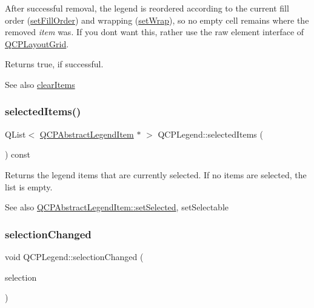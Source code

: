 After successful removal, the legend is reordered according to the current fill order (\hyperlink{class_q_c_p_layout_grid_affc2f3cfd22f28698c5b29b960d2a391}{set\+Fill\+Order}) and wrapping (\hyperlink{class_q_c_p_layout_grid_ab36af18d77e4428386d02970382ee598}{set\+Wrap}), so no empty cell remains where the removed {\itshape item} was. If you don\textquotesingle{}t want this, rather use the raw element interface of \hyperlink{class_q_c_p_layout_grid}{Q\+C\+P\+Layout\+Grid}.

Returns true, if successful.

\begin{DoxySeeAlso}{See also}
\hyperlink{class_q_c_p_legend_a24795c7250eb5214fcea16b7217b4dfb}{clear\+Items} 
\end{DoxySeeAlso}
\mbox{\label{class_q_c_p_legend_ac7d9e567d5c551e09cd9bcc4306c5532}} 
\subsubsection{\texorpdfstring{selected\+Items()}{selectedItems()}}
{\footnotesize\ttfamily Q\+List$<$ \hyperlink{class_q_c_p_abstract_legend_item}{Q\+C\+P\+Abstract\+Legend\+Item} $\ast$ $>$ Q\+C\+P\+Legend\+::selected\+Items (\begin{DoxyParamCaption}{ }\end{DoxyParamCaption}) const}

Returns the legend items that are currently selected. If no items are selected, the list is empty.

\begin{DoxySeeAlso}{See also}
\hyperlink{class_q_c_p_abstract_legend_item_a6eed93b0ab99cb3eabb043fb08179c2b}{Q\+C\+P\+Abstract\+Legend\+Item\+::set\+Selected}, set\+Selectable 
\end{DoxySeeAlso}
\mbox{\label{class_q_c_p_legend_a82c88464edac07a9eefaf3906268df3b}} 
\subsubsection{\texorpdfstring{selection\+Changed}{selectionChanged}}
{\footnotesize\ttfamily void Q\+C\+P\+Legend\+::selection\+Changed (\begin{DoxyParamCaption}\item[{Q\+C\+P\+Legend\+::\+Selectable\+Parts}]{selection }\end{DoxyParamCaption})\hspace{0.3cm}{\ttfamily [signal]}}

